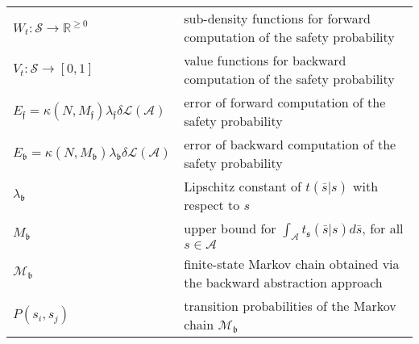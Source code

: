 \documentclass{LMCS}
\begin{document}
\begin{longtable}{lp{10.5cm}}
$W_t:\mathcal S\rightarrow\mathbb R^{\ge 0}$ & sub-density functions for forward computation of the safety probability\\
$V_t:\mathcal S\rightarrow[0,1]$ & value functions for backward computation of the safety probability\\
$E_{\mathfrak f} = \kappa(N,M_{\mathfrak f})\lambda_{\mathfrak f}\delta\mathcal L(\mathcal A)$ & error of forward computation of the safety probability\\
$E_{\mathfrak b} = \kappa(N,M_{\mathfrak b})\lambda_{\mathfrak b}\delta \mathcal L(\mathcal A)$ & error of backward computation of the safety probability\\
$\lambda_{\mathfrak b}$ & Lipschitz constant of $t(\bar s|s)$ with respect to $s$\\
$M_{\mathfrak b}$ & upper bound for $\int_{\mathcal A}t_{\mathfrak s}(\bar s|s)d\bar s$, for all $s\in\mathcal A$\\
$\mathscr M_{\mathfrak b}$ & finite-state Markov chain obtained via the backward abstraction approach\\
$P(s_i,s_j)$ & transition probabilities of the Markov chain $\mathscr M_{\mathfrak b}$
\end{longtable}
\end{document}
